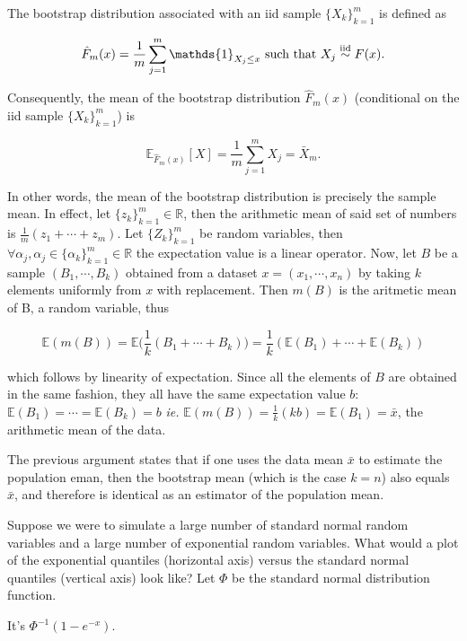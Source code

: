 \documentclass{homework}
\begin{document}
The bootstrap distribution associated with an iid sample $\{X_{k}\}_{k=1}^{m}$ is defined as 

$$
\hat{F}_{m}(x) = \frac{1}{m} \sum_{j=1}^{m} \mathds{1}_{X_j \leq x} \textnormal{ such that } X_j \overset{\textnormal{iid}}{\sim} F(x).
$$

Consequently, the mean of the bootstrap distribution $\hat{F}_{m}(x)$ (conditional on the iid sample $\{X_{k}\}_{k=1}^{m}$) is 

$$
\mathds{E}_{\hat{F}_{m}(x)}[X] = \frac{1}{m} \sum_{j=1}^{m} X_j = \bar{X}_m.
$$

In other words, the mean of the bootstrap distribution is precisely the sample mean. In effect, let $\{z_{k}\}_{k=1}^{m} \in \mathds{R}$, then the arithmetic mean of said set of numbers is $\frac{1}{m}(z_{1} + \cdots + z_m)$. Let $\{Z_k\}_{k=1}^{m}$ be random variables, then $\forall \alpha_{j}, \alpha_{j} \in  \{\alpha_{k}\}_{k=1}^{m} \in \mathds{R}$ the expectation value is a linear operator. Now, let $B$ be a sample $(B_1, \cdots, B_k)$ obtained from a dataset $x=(x_{1}, \cdots, x_n)$ by taking $k$ elements uniformly from $x$ with replacement. Then $m(B)$ is the aritmetic mean of B, a random variable, thus 

$$
\mathds{E}(m(B)) = \mathds{E}\bigg(\frac{1}{k}(B_1 + \cdots + B_k)\bigg) = \frac{1}{k} (\mathds{E}(B_1)+\cdots+\mathds{E}(B_k)) $$

which follows by linearity of expectation. Since all the elements of $B$ are obtained in the same fashion, they all have the same expectation value $b$: $\mathds{E}(B_1) = \cdots = \mathds{E}(B_k) = b$ \textit{ie. } $\mathds{E}(m(B)) = \frac{1}{k}(kb) = \mathds{E}(B_1) = \bar{x}$, the arithmetic mean of the data. 

The previous argument states that if one uses the data mean $\bar x$ to estimate the population eman, then the bootstrap mean (which is the case $k=n$) also equals $\bar x$, and therefore is identical as an estimator of the population mean. 

\begin{tcolorbox}[title=Question 9]
Suppose we were to simulate a large number of standard normal random variables and a large number of exponential random variables. What would a plot of the exponential quantiles (horizontal axis) versus the standard normal quantiles (vertical axis) look like? Let $\Phi$ be the standard normal distribution function.
\end{tcolorbox}

It's $\Phi^{-1}(1-e^{-x})$. 
\end{document}
